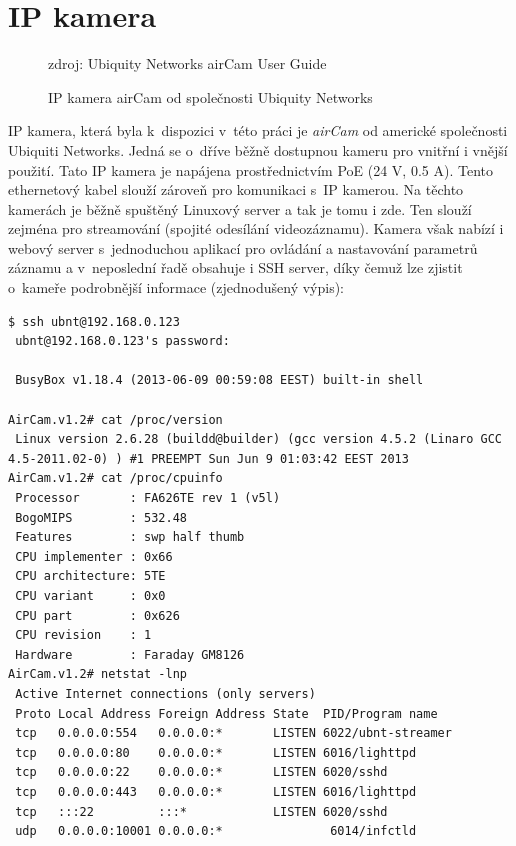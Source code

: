 
\section{IP kamera}

\begin{figure}[h]
    \centering
	\caption{IP kamera airCam od společnosti Ubiquity Networks}
	\small zdroj: Ubiquity Networks airCam User Guide
	\label{fig:aircam}
\end{figure}

IP kamera, která byla k~dispozici v~této práci je \textit{airCam} \cite{aircam} od americké společnosti Ubiquiti Networks. Jedná se o~dříve běžně dostupnou kameru pro vnitřní i vnější použití. Tato IP kamera je napájena prostřednictvím PoE (24 V, 0.5 A). Tento ethernetový kabel slouží zároveň pro komunikaci s~IP kamerou. Na těchto kamerách je běžně spuštěný Linuxový server a tak je tomu i zde. Ten slouží zejména pro streamování (spojité odesílání videozáznamu). Kamera však nabízí i webový server s~jednoduchou aplikací pro ovládání a nastavování parametrů záznamu a v~neposlední řadě obsahuje i SSH server, díky čemuž lze zjistit o~kameře podrobnější informace (zjednodušený výpis):

\begin{verbatim}
$ ssh ubnt@192.168.0.123
 ubnt@192.168.0.123's password: 

 BusyBox v1.18.4 (2013-06-09 00:59:08 EEST) built-in shell

AirCam.v1.2# cat /proc/version
 Linux version 2.6.28 (buildd@builder) (gcc version 4.5.2 (Linaro GCC 4.5-2011.02-0) ) #1 PREEMPT Sun Jun 9 01:03:42 EEST 2013
AirCam.v1.2# cat /proc/cpuinfo
 Processor       : FA626TE rev 1 (v5l)
 BogoMIPS        : 532.48
 Features        : swp half thumb 
 CPU implementer : 0x66
 CPU architecture: 5TE
 CPU variant     : 0x0
 CPU part        : 0x626
 CPU revision    : 1
 Hardware        : Faraday GM8126
AirCam.v1.2# netstat -lnp
 Active Internet connections (only servers)
 Proto Local Address Foreign Address State  PID/Program name    
 tcp   0.0.0.0:554   0.0.0.0:*       LISTEN 6022/ubnt-streamer
 tcp   0.0.0.0:80    0.0.0.0:*       LISTEN 6016/lighttpd
 tcp   0.0.0.0:22    0.0.0.0:*       LISTEN 6020/sshd
 tcp   0.0.0.0:443   0.0.0.0:*       LISTEN 6016/lighttpd
 tcp   :::22         :::*            LISTEN 6020/sshd
 udp   0.0.0.0:10001 0.0.0.0:*               6014/infctld
\end{verbatim}

